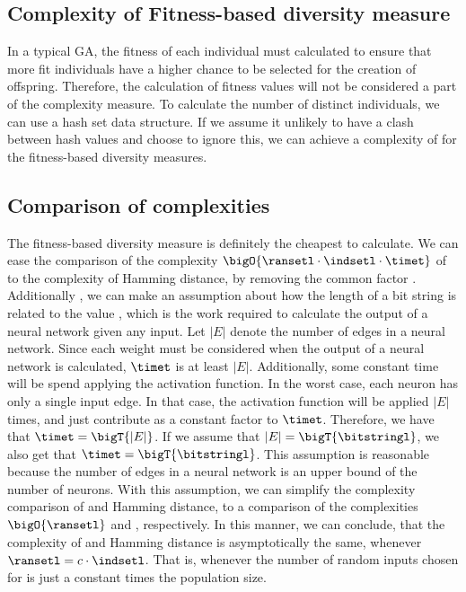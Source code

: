 \subsection{Complexity of Fitness-based diversity measure}
In a typical GA, the fitness of each individual must calculated to ensure that more fit individuals have a higher chance to be selected for the creation of offspring.
Therefore, the calculation of fitness values will not be considered a part of the complexity measure.
To calculate the number of distinct individuals, we can use a hash set data structure. If we assume it unlikely to have a clash between hash values and choose to ignore this, we can achieve a complexity of \bigO{\indsetl} for the fitness-based diversity measures.

\subsection{Comparison of complexities}
The fitness-based diversity measure is definitely the cheapest to calculate.
We can ease the comparison of the complexity $\bigO{\ransetl\cdot\indsetl\cdot\timet}$ of \dia{} to the complexity \bigO{\indsetl^2 \cdot \bitstringl} of Hamming distance, by removing the common factor \indsetl.
Additionally , we can make an assumption about how the length of a bit string \bitstringl{} is related to the value \timet, which is the work required to calculate the output of a neural network given any input.
Let $|E|$ denote the number of edges in a neural network.
Since each weight must be considered when the output of a neural network is calculated, $\timet${} is at least $|E|$.
Additionally, some constant time will be spend applying the activation function.
In the worst case, each neuron has only a single input edge. In that case, the activation function will be applied
$|E|$ times, and just contribute as a constant factor to $\timet$. Therefore, we have that $\timet = \bigT{|E|}$.
If we assume that $|E| = \bigT{\bitstringl}$, we also get that $\timet = \bigT{\bitstringl}$.
This assumption is reasonable because the number of edges in a neural network is an upper bound of the number of neurons.
With this assumption, we can simplify the complexity comparison of \dia{} and Hamming distance, to a comparison of the complexities $\bigO{\ransetl}$ and \bigO{\indsetl}, respectively.
In this manner, we can conclude, that the complexity of \dia{} and Hamming distance is asymptotically the same, whenever
$\ransetl = c \cdot \indsetl$. That is, whenever the number of random inputs chosen for \dia{} is just a constant times the population size.